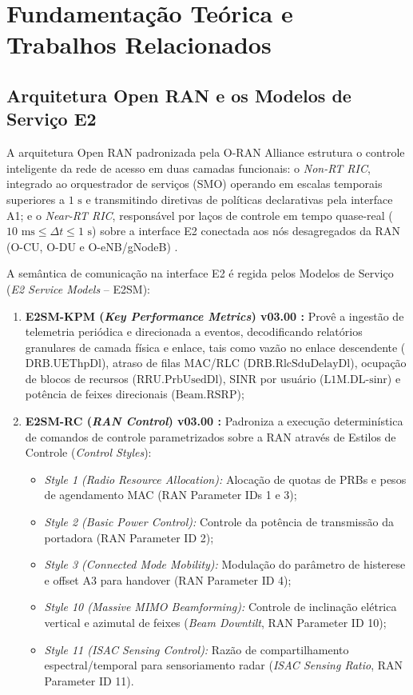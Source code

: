 \documentclass[12pt]{article}
\begin{document}
\section{Fundamentação Teórica e Trabalhos Relacionados}
\label{sec:fundamentacao}

\subsection{Arquitetura Open RAN e os Modelos de Serviço E2}

A arquitetura Open RAN padronizada pela O-RAN Alliance \cite{oran_wg1_arch} estrutura o controle inteligente da rede de acesso em duas camadas funcionais: o \textit{Non-RT RIC}, integrado ao orquestrador de serviços (SMO) operando em escalas temporais superiores a $1\text{ s}$ e transmitindo diretivas de políticas declarativas pela interface A1; e o \textit{Near-RT RIC}, responsável por laços de controle em tempo quase-real ($10\text{ ms} \le \Delta t \le 1\text{ s}$) sobre a interface E2 conectada aos nós desagregados da RAN (O-CU, O-DU e O-eNB/gNodeB) \cite{oran_wg3_ric}.

A semântica de comunicação na interface E2 é regida pelos Modelos de Serviço (\textit{E2 Service Models} -- E2SM):
\begin{enumerate}
    \item \textbf{E2SM-KPM (\textit{Key Performance Metrics}) v03.00 \cite{oran_wg3_e2sm_kpm}:} Provê a ingestão de telemetria periódica e direcionada a eventos, decodificando relatórios granulares de camada física e enlace, tais como vazão no enlace descendente ($\text{DRB.UEThpDl}$), atraso de filas MAC/RLC ($\text{DRB.RlcSduDelayDl}$), ocupação de blocos de recursos ($\text{RRU.PrbUsedDl}$), SINR por usuário ($\text{L1M.DL-sinr}$) e potência de feixes direcionais ($\text{Beam.RSRP}$);
    \item \textbf{E2SM-RC (\textit{RAN Control}) v03.00 \cite{oran_wg3_e2sm_rc}:} Padroniza a execução determinística de comandos de controle parametrizados sobre a RAN através de Estilos de Controle (\textit{Control Styles}):
    \begin{itemize}
        \item \textit{Style 1 (Radio Resource Allocation):} Alocação de quotas de PRBs e pesos de agendamento MAC (RAN Parameter IDs 1 e 3);
        \item \textit{Style 2 (Basic Power Control):} Controle da potência de transmissão da portadora (RAN Parameter ID 2);
        \item \textit{Style 3 (Connected Mode Mobility):} Modulação do parâmetro de histerese e offset A3 para handover (RAN Parameter ID 4);
        \item \textit{Style 10 (Massive MIMO Beamforming):} Controle de inclinação elétrica vertical e azimutal de feixes (\textit{Beam Downtilt}, RAN Parameter ID 10);
        \item \textit{Style 11 (ISAC Sensing Control):} Razão de compartilhamento espectral/temporal para sensoriamento radar (\textit{ISAC Sensing Ratio}, RAN Parameter ID 11).
    \end{itemize}
\end{enumerate}
\end{document}
